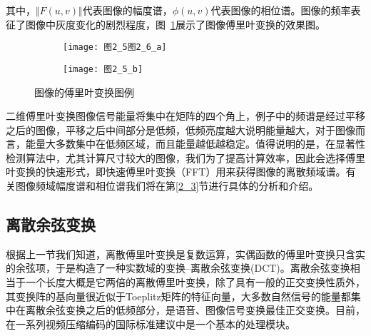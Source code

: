 其中，$\Vert F(u,v)\Vert$代表图像的幅度谱，$\phi(u,v)$代表图像的相位谱。图像的频率表征了图像中灰度变化的剧烈程度，图~\ref{图2_5}展示了图像傅里叶变换的效果图。
\begin{figure}[t]
  \centering%
  \begin{subfigure}{3cm}
    \texttt{[image: 图2\_5图2\_6\_a]}
  \end{subfigure}
  \hspace{4em}%
  \begin{subfigure}{0.25\textwidth}
    \texttt{[image: 图2\_5\_b]}
  \end{subfigure}
  \caption{图像的傅里叶变换图例}
  \label{图2_5} 
\end{figure}

二维傅里叶变换图像信号能量将集中在矩阵的四个角上，例子中的频谱是经过平移之后的图像，平移之后中间部分是低频，低频亮度越大说明能量越大，对于图像而言，能量大多数集中在低频区域，而且能量越低越稳定\cite{Gonzalez2005book}。值得说明的是，在显著性检测算法中，尤其计算尺寸较大的图像，我们为了提高计算效率，因此会选择傅里叶变换的快速形式，即快速傅里叶变换（FFT）用来获得图像的离散频域谱。有关图像频域幅度谱和相位谱我们将在第\ref{2_3}节进行具体的分析和介绍。

\subsection{离散余弦变换}
\label{2_2_2}

根据上一节我们知道，离散傅里叶变换是复数运算，实偶函数的傅里叶变换只含实的余弦项，于是构造了一种实数域的变换--离散余弦变换(DCT)\cite{Rao2014book}。离散余弦变换相当于一个长度大概是它两倍的离散傅里叶变换，除了具有一般的正交变换性质外，其变换阵的基向量很近似于Toeplitz矩阵的特征向量，大多数自然信号的能量都集中在离散余弦变换之后的低频部分，是语音、图像信号变换最佳正交变换。目前，在一系列视频压缩编码的国际标准建议中是一个基本的处理模块。

